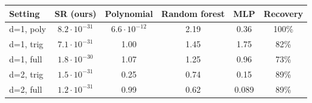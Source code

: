 \begin{tabular}{lccccc}
\toprule
Setting & SR (ours) & Polynomial & Random forest & MLP & Recovery \\
\midrule
d=1, poly & $8.2\!\cdot\!10^{-31}$ & $6.6\!\cdot\!10^{-12}$ & 2.19 & 0.36 & 100\% \\
d=1, trig & $7.1\!\cdot\!10^{-31}$ & 1.00 & 1.45 & 1.75 & 82\% \\
d=1, full & $1.8\!\cdot\!10^{-30}$ & 1.07 & 1.25 & 0.96 & 73\% \\
d=2, trig & $1.5\!\cdot\!10^{-31}$ & 0.25 & 0.74 & 0.15 & 89\% \\
d=2, full & $1.2\!\cdot\!10^{-31}$ & 0.99 & 0.62 & 0.089 & 89\% \\
\bottomrule
\end{tabular}